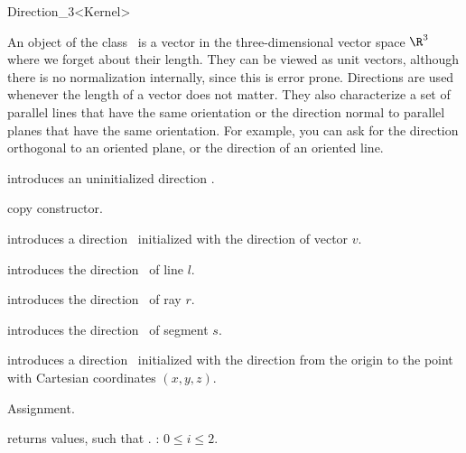 \begin{ccRefClass}{Direction_3<Kernel>}

\ccDefinition
An object of the class \ccRefName\ is a vector in the three-dimensional 
vector space $\R^3$  where we forget about their length. They can be
viewed as unit vectors, although there is no normalization internally,
since this is error prone.  Directions are used whenever the length of
a vector does not matter. 
They also characterize a set of parallel lines that have the same orientation 
or the direction normal to parallel planes that have the same orientation.
For example, you can ask for the direction
orthogonal to an oriented plane, or the direction of an oriented line.


\ccCreation
{}


\ccHidden {}
             {introduces an uninitialized direction \ccVar.}

\ccHidden {}
            {copy constructor.}

            {introduces a direction \ccVar\ initialized with the 
             direction of vector $v$.}

            {introduces the direction \ccVar\ of line $l$.}

            {introduces the direction \ccVar\ of ray $r$.}

            {introduces the direction \ccVar\ of segment $s$.}

            {introduces a direction \ccVar\ initialized with the direction 
             from the origin to the point with Cartesian coordinates $(x, y, z)$.}


\ccOperations

\ccHidden {}
        {Assignment.}

       {returns values, such that \ccVar {}.
        \ccPrecond: $0 \leq i \leq 2$.}


\end{ccRefClass}

